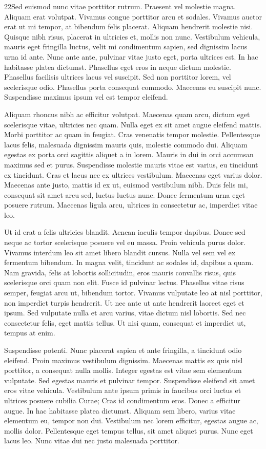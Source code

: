 22Sed euismod nunc vitae porttitor rutrum. Praesent vel molestie magna. Aliquam erat volutpat. Vivamus congue porttitor arcu et sodales. Vivamus auctor erat ut mi tempor, at bibendum felis placerat. Aliquam hendrerit molestie nisi. Quisque nibh risus, placerat in ultricies et, mollis non nunc. Vestibulum vehicula, mauris eget fringilla luctus, velit mi condimentum sapien, sed dignissim lacus urna id ante. Nunc ante ante, pulvinar vitae justo eget, porta ultrices est. In hac habitasse platea dictumst. Phasellus eget eros in neque dictum molestie. Phasellus facilisis ultrices lacus vel suscipit. Sed non porttitor lorem, vel scelerisque odio. Phasellus porta consequat commodo. Maecenas eu suscipit nunc. Suspendisse maximus ipsum vel est tempor eleifend.

Aliquam rhoncus nibh ac efficitur volutpat. Maecenas quam arcu, dictum eget scelerisque vitae, ultricies nec quam. Nulla eget ex sit amet augue eleifend mattis. Morbi porttitor ac quam in feugiat. Cras venenatis tempor molestie. Pellentesque lacus felis, malesuada dignissim mauris quis, molestie commodo dui. Aliquam egestas ex porta orci sagittis aliquet a in lorem. Mauris in dui in orci accumsan maximus sed et purus. Suspendisse molestie mauris vitae est varius, eu tincidunt ex tincidunt. Cras et lacus nec ex ultrices vestibulum. Maecenas eget varius dolor. Maecenas ante justo, mattis id ex ut, euismod vestibulum nibh. Duis felis mi, consequat sit amet arcu sed, luctus luctus nunc. Donec fermentum urna eget posuere rutrum. Maecenas ligula arcu, ultrices in consectetur ac, imperdiet vitae leo.

Ut id erat a felis ultricies blandit. Aenean iaculis tempor dapibus. Donec sed neque ac tortor scelerisque posuere vel eu massa. Proin vehicula purus dolor. Vivamus interdum leo sit amet libero blandit cursus. Nulla vel sem vel ex fermentum bibendum. In magna velit, tincidunt ac sodales id, dapibus a quam. Nam gravida, felis at lobortis sollicitudin, eros mauris convallis risus, quis scelerisque orci quam non elit. Fusce id pulvinar lectus. Phasellus vitae risus semper, feugiat arcu ut, bibendum tortor. Vivamus vulputate leo at nisl porttitor, non imperdiet turpis hendrerit. Ut nec ante ut ante hendrerit laoreet eget et ipsum. Sed vulputate nulla et arcu varius, vitae dictum nisl lobortis. Sed nec consectetur felis, eget mattis tellus. Ut nisi quam, consequat et imperdiet ut, tempus at enim.

Suspendisse potenti. Nunc placerat sapien et ante fringilla, a tincidunt odio eleifend. Proin maximus vestibulum dignissim. Maecenas mattis ex quis nisl porttitor, a consequat nulla mollis. Integer egestas est vitae sem elementum vulputate. Sed egestas mauris et pulvinar tempor. Suspendisse eleifend sit amet eros vitae vehicula. Vestibulum ante ipsum primis in faucibus orci luctus et ultrices posuere cubilia Curae; Cras id condimentum eros. Donec a efficitur augue. In hac habitasse platea dictumst. Aliquam sem libero, varius vitae elementum eu, tempor non dui. Vestibulum nec lorem efficitur, egestas augue ac, mollis dolor. Pellentesque eget tempus tellus, sit amet aliquet purus. Nunc eget lacus leo. Nunc vitae dui nec justo malesuada porttitor.

